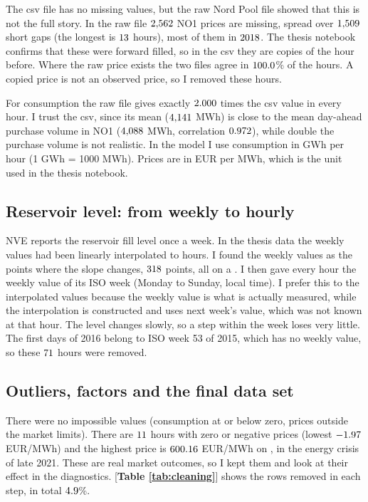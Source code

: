 \documentclass[12pt]{article}
\newcommand{\eur}{EUR/MWh}
\begin{document}
The csv file has no missing values, but the raw Nord Pool file showed that this is not the full story. In the raw file $2{,}562$ NO1 prices are missing, spread over $1{,}509$ short gaps (the longest is $13$ hours), most of them in $2018$. The thesis notebook confirms that these were forward filled, so in the csv they are copies of the hour before. Where the raw price exists the two files agree in $100.0$\% of the hours. A copied price is not an observed price, so I removed these hours.

For consumption the raw file gives exactly $2.000$ times the csv value in every hour. I trust the csv, since its mean ($4{,}141$ MWh) is close to the mean day-ahead purchase volume in NO1 ($4{,}088$ MWh, correlation $0.972$), while double the purchase volume is not realistic. In the model I use consumption in GWh per hour (1 GWh = 1000 MWh). Prices are in EUR per MWh, which is the unit used in the thesis notebook.

\subsection{Reservoir level: from weekly to hourly}

NVE reports the reservoir fill level once a week. In the thesis data the weekly values had been linearly interpolated to hours. I found the weekly values as the points where the slope changes, $318$ points, all on a \knotWeekday. I then gave every hour the weekly value of its ISO week (Monday to Sunday, local time). I prefer this to the interpolated values because the weekly value is what is actually measured, while the interpolation is constructed and uses next week's value, which was not known at that hour. The level changes slowly, so a step within the week loses very little. The first days of 2016 belong to ISO week 53 of 2015, which has no weekly value, so these $71$ hours were removed.

\subsection{Outliers, factors and the final data set}

There were no impossible values (consumption at or below zero, prices outside the market limits). There are $11$ hours with zero or negative prices (lowest $-1.97$ \eur) and the highest price is $600.16$ \eur{} on \maxPriceTime, in the energy crisis of late 2021. These are real market outcomes, so I kept them and look at their effect in the diagnostics. [\textbf{Table \ref{tab:cleaning}}] shows the rows removed in each step, in total $4.9$\%.
\end{document}
